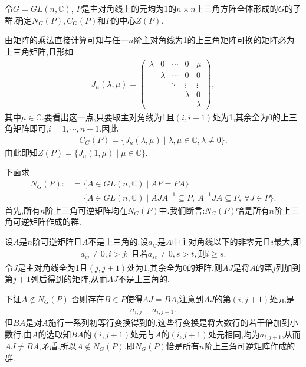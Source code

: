 \documentclass[../../main.tex]{subfiles}%
\begin{document}
\begin{example}
令$G=GL(n,\mathbb{C})$, $P$是主对角线上的元均为1的$n\times n$上三角方阵全体形成的$G$的子群.确定$N_G(P),C_G(P)$和$P$的中心$Z(P)$.
\end{example}
\begin{solution}

由矩阵的乘法直接计算可知与任一$n$阶主对角线为1的上三角矩阵可换的矩阵必为上三角矩阵,且形如
\begin{align*}
J_n(\lambda,\mu)=\begin{pmatrix}
\lambda & 0 & \cdots & 0 & \mu \\
& \lambda & \cdots & 0 & 0 \\
& & \ddots & \vdots & \vdots \\
& & & \lambda & 0 \\
& & & & \lambda
\end{pmatrix},
\end{align*}
其中$\mu\in\mathbb{C}$.要看出这一点,只要取主对角线为1且$(i,i+1)$处为1,其余全为0的上三角矩阵即可,$i=1,\cdots,n-1$.因此
\begin{align*}
C_G(P)=\{J_n(\lambda,\mu)\mid \lambda,\mu\in\mathbb{C},\lambda\ne 0\}.
\end{align*}
由此即知$Z(P)=\{J_n(1,\mu)\mid \mu\in\mathbb{C}\}$.

下面求
\begin{align*}
N_G(P):&=\{A\in GL(n,\mathbb{C})\mid AP=PA\} \\
&=\{A\in GL(n,\mathbb{C})\mid AJA^{-1}\subseteq P,\ A^{-1}JA\subseteq P,\ \forall J\in P\}.
\end{align*}
首先,所有$n$阶上三角可逆矩阵均在$N_G(P)$中.我们断言:$N_G(P)$恰是所有$n$阶上三角可逆矩阵作成的群.

设$A$是$n$阶可逆矩阵且$A$不是上三角的.设$a_{ij}$是$A$中主对角线以下的非零元且$i$最大,即
\begin{align*}
a_{ij}\ne 0,i>j;\ \text{且若}a_{st}\ne 0,s>t,\text{则}i\geqslant s.
\end{align*}
令$J$是主对角线全为1且$(j,j+1)$处为1,其余全为0的矩阵.则$AJ$是将$A$的第$j$列加到第$j+1$列后得到的矩阵,从而$AJ$不是上三角的.

下证$A\notin N_G(P)$.否则存在$B\in P$使得$AJ=BA$,注意到$AJ$的第$(i,j+1)$处元是
\begin{align*}
a_{i,j}+a_{i,j+1}.
\end{align*}
但$BA$是对$A$施行一系列初等行变换得到的,这些行变换是将大数行的若干倍加到小数行.由$A$的选取知$BA$的$(i,j+1)$处元与$A$的$(i,j+1)$处元相同,均为$a_{i,j+1}$,从而$AJ\ne BA$,矛盾.所以$A\notin N_G(P)$.即$N_G(P)$恰是所有$n$阶上三角可逆矩阵作成的群.

\end{solution}
\end{document}
